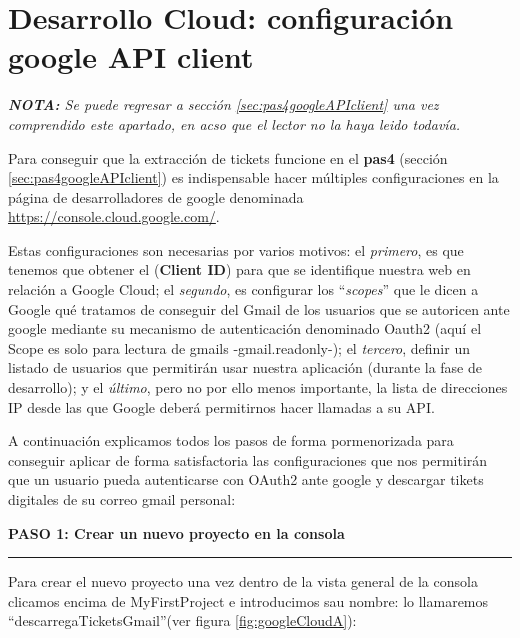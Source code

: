 \documentclass[a4paper,12pt]{report}
\begin{document}
		
		
	\section{Desarrollo Cloud: configuración google API client}
	\label{sec:desarrolloCloudGoogleApi}
	
	\noindent \textit{\textbf{NOTA:} Se puede regresar a sección \ref{sec:pas4googleAPIclient} una vez comprendido este apartado, en acso que el lector no la haya leido todavía.}
	
	Para conseguir que la extracción de tickets funcione en el \textbf{pas4} (sección \ref{sec:pas4googleAPIclient}) es indispensable hacer múltiples configuraciones en la página de desarrolladores de google denominada \href{https://console.cloud.google.com/}{https://console.cloud.google.com/}. 
	
	Estas configuraciones son necesarias por varios motivos: el \textit{primero}, es que tenemos que  obtener el (\textbf{Client ID}) para que se identifique nuestra web en relación a Google Cloud; el \textit{segundo}, es configurar los ``\textit{scopes}'' que le dicen a Google qué tratamos de conseguir del Gmail de los usuarios que se autoricen ante google mediante su mecanismo de autenticación denominado Oauth2 (aquí el Scope es solo para lectura de gmails -gmail.readonly-); el \textit{tercero}, definir un listado de usuarios que permitirán usar nuestra aplicación (durante la fase de desarrollo); y el \textit{último}, pero no por ello menos importante, la lista de direcciones IP desde las que Google deberá permitirnos hacer llamadas a su API.
	
	A continuación explicamos todos los pasos de forma pormenorizada para conseguir aplicar de forma satisfactoria las configuraciones que nos permitirán que un usuario pueda autenticarse con OAuth2 ante google y descargar tikets digitales de su correo gmail personal:
	
	
	\noindent \textbf{PASO 1: Crear un nuevo proyecto en la consola}
	\vspace{.2em}
	\hrule
	\vspace{.5em}
	
	Para crear  el nuevo proyecto una vez dentro de la vista general de la consola clicamos encima de MyFirstProject e introducimos sau nombre: lo llamaremos ``descarregaTicketsGmail''(ver figura \ref{fig:googleCloudA}):
	
\end{document}
